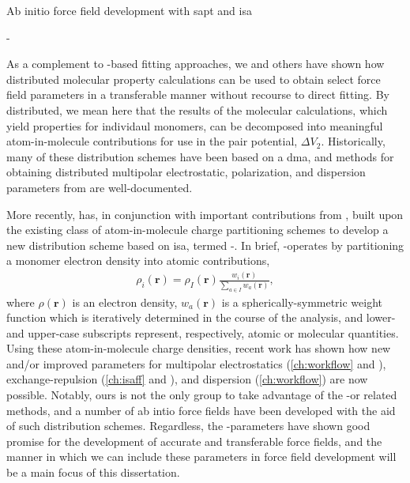 \begin{section}{Ab initio force field development with \acrshort{sapt} and
\acrshort{isa}}
\begin{subsection}{\sapt}
\end{subsection}

\begin{subsection}{\isa-\dma}
\label{sec:intro-isa}

As a complement to \sapt-based fitting approaches, we and others have shown
how distributed molecular property calculations can be used to obtain select force field
parameters in a transferable manner without recourse to direct fitting.
\cite{Stone2007,camcasp5.8,Metz2016} 
By distributed, we mean here that the results of the molecular calculations, which
yield properties for individaul monomers, can be decomposed into meaningful
atom-in-molecule contributions for use in the pair potential, $\Delta V_2$. Historically,
many of these distribution schemes have been based on a \acrfull{dma}, and methods for
obtaining distributed multipolar electrostatic,\cite{Stone1981,Stone2005}
polarization,\cite{Misquitta2006}
and
dispersion\cite{Williams2003,Misquitta2008,McDaniel2013}
parameters
from \dma are well-documented.\cite{McDaniel2014a,Stone2007}

More recently, \citet{Misquitta2014} has, in conjunction with important
contributions from
\citeauthor{Lillestolen2008},\cite{Lillestolen2008,Lillestolen2009} 
built upon the existing class of \citet{Hirshfeld1977} atom-in-molecule
charge partitioning schemes to develop a new distribution scheme based on
\acrfull{isa}, 
termed \isa-\dma. In brief, \isa-\dma operates by partitioning a monomer
electron density into atomic contributions,
\begin{align}
\rho_i(\mathbf{r}) = \rho_I(\mathbf{r})
\frac{ w_i(\mathbf{r}) }{ \sum \limits_{a \in I} w_a(\mathbf{r}) }, 
\end{align}
where $\rho(\mathbf{r})$ is an electron density, $w_a(\mathbf{r})$ is a
spherically-symmetric weight function which is iteratively determined in the
course of the \isa analysis, and lower- and upper-case subscripts
represent, respectively, atomic or molecular quantities.
\cite{Misquitta2014}
Using these atom-in-molecule charge densities, recent work has shown how
new and/or improved parameters for multipolar electrostatics 
(\cref{ch:workflow} and ),
exchange-repulsion (\cref{ch:isaff} and ),
and dispersion (\cref{ch:workflow})
are now possible.
Notably, ours is not the only group to take advantage of the \isa-\dma or related
methods,
\cite{Verstraelen2016}
and a number of ab intio force fields have been developed with the aid of such
distribution schemes.
\cite{Vandenbrande2016,Verstraelen2014,Misquitta2016,Metz2016}
Regardless, the \isa-\dma parameters have shown good promise for the
development of accurate and transferable force fields, and the manner in which
we can include these parameters in force field development will be a main
focus of this dissertation.

\end{subsection}


\end{section}
